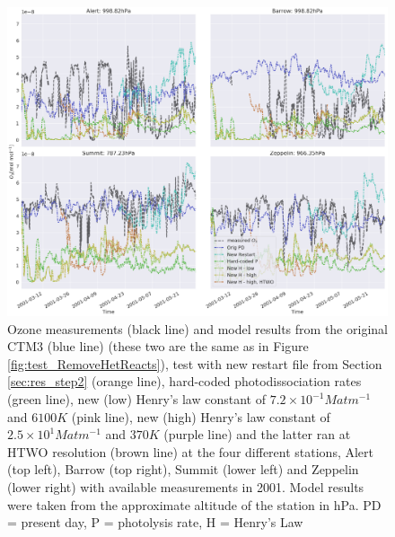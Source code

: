 \begin{figure}[ht]
    \centering
    \includegraphics[width=\linewidth]{Chapter6_Results/images/ozone_2001_step3.png}
    \caption{Ozone measurements (black line) and model results from the original CTM3 (blue line) (these two are the same as in Figure \ref{fig:test_RemoveHetReacts}), test with new restart file from Section \ref{sec:res_step2} (orange line), hard-coded photodissociation rates (green line), new (low) Henry's law constant of $7.2\times10^{-1} M atm ^{-1}$ and $6100 K$ (pink line), new (high) Henry's law constant of $2.5\times10^{1} M atm ^{-1}$ and $370 K$ (purple line) and the latter ran at HTWO resolution (brown line) at the four different stations, Alert (top left), Barrow (top right), Summit (lower left) and Zeppelin (lower right) with available measurements in 2001. Model results were taken from the approximate altitude of the station in hPa. PD = present day, P = photolysis rate, H = Henry's Law}
    \label{fig:ozone_2001_step3}
\end{figure}